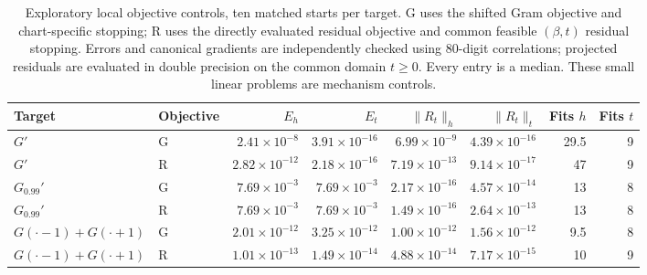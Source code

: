 \begin{table}[htbp]\centering\footnotesize
\setlength{\tabcolsep}{3pt}
\caption{Exploratory local objective controls, ten matched starts per target. G uses the shifted Gram objective and chart-specific stopping; R uses the directly evaluated residual objective and common feasible $(\beta,t)$ residual stopping. Errors and canonical gradients are independently checked using 80-digit correlations; projected residuals are evaluated in double precision on the common domain $t\ge0$. Every entry is a median. These small linear problems are mechanism controls.}
\label{tab:objective-controls}
\begin{tabular}{@{}llrrrrrr@{}}\toprule
Target & Objective & $E_h$ & $E_t$ & $\|R_t\|_h$ & $\|R_t\|_t$ & Fits $h$ & Fits $t$\\\midrule
$G'$ & G & $2.41\times10^{-8}$ & $3.91\times10^{-16}$ & $6.99\times10^{-9}$ & $4.39\times10^{-16}$ & 29.5 & 9\\
$G'$ & R & $2.82\times10^{-12}$ & $2.18\times10^{-16}$ & $7.19\times10^{-13}$ & $9.14\times10^{-17}$ & 47 & 9\\
$G_{0.99}'$ & G & $7.69\times10^{-3}$ & $7.69\times10^{-3}$ & $2.17\times10^{-16}$ & $4.57\times10^{-14}$ & 13 & 8\\
$G_{0.99}'$ & R & $7.69\times10^{-3}$ & $7.69\times10^{-3}$ & $1.49\times10^{-16}$ & $2.64\times10^{-13}$ & 13 & 8\\
$G(\cdot-1)+G(\cdot+1)$ & G & $2.01\times10^{-12}$ & $3.25\times10^{-12}$ & $1.00\times10^{-12}$ & $1.56\times10^{-12}$ & 9.5 & 8\\
$G(\cdot-1)+G(\cdot+1)$ & R & $1.01\times10^{-13}$ & $1.49\times10^{-14}$ & $4.88\times10^{-14}$ & $7.17\times10^{-15}$ & 10 & 9\\
\bottomrule\end{tabular}
\end{table}
